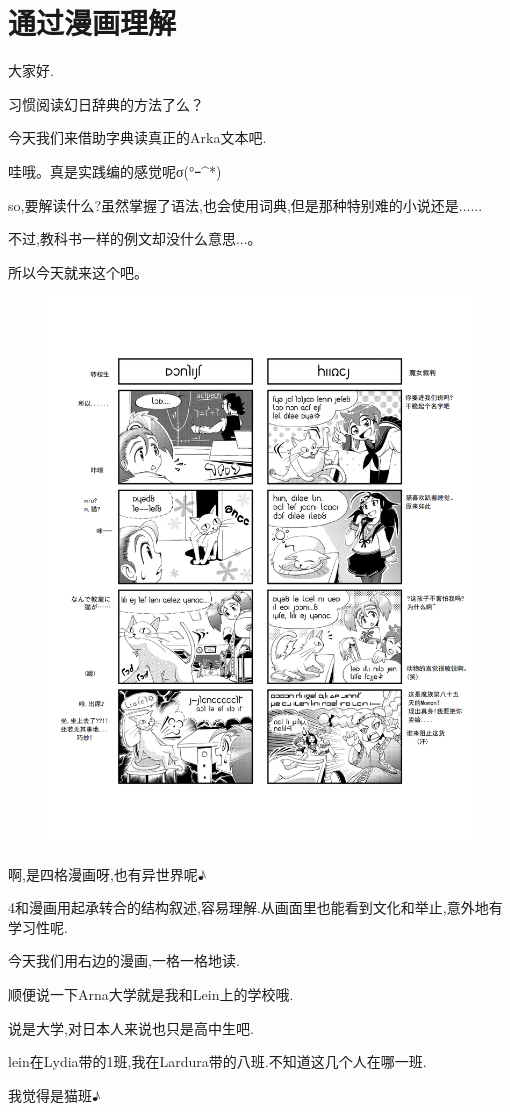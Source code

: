 \section{通过漫画理解}

大家好.

习惯阅读幻日辞典的方法了么？

今天我们来借助字典读真正的Arka文本吧.


哇哦。真是实践编的感觉呢σ(°ｰ\^{}*)

so,要解读什么?虽然掌握了语法,也会使用词典,但是那种特别难的小说还是......

不过,教科书一样的例文却没什么意思...。


所以今天就来这个吧。
\begin{figure}[H]
\includegraphics[width=\textwidth]{pngs/xarl2.png}%
\end{figure}



啊,是四格漫画呀,也有异世界呢♪


4和漫画用起承转合的结构叙述,容易理解.从画面里也能看到文化和举止,意外地有学习性呢.

今天我们用右边的漫画,一格一格地读.

顺便说一下Arna大学就是我和Lein上的学校哦.

说是大学,对日本人来说也只是高中生吧.

lein在Lydia带的1班,我在Lardura带的八班.不知道这几个人在哪一班.


我觉得是猫班♪
